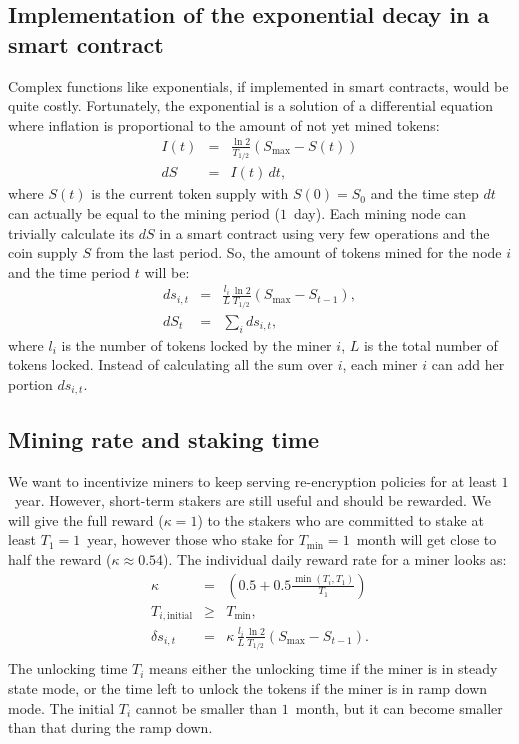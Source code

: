 \documentclass[longbibliography,nofootinbib,twocolumn]{revtex4-1}
\begin{document}
\subsection{Implementation of the exponential decay in a smart contract}

Complex functions like exponentials, if implemented in smart contracts, would be quite costly.
Fortunately, the exponential is a solution of a differential equation where inflation is proportional to the amount of not yet mined tokens:
\begin{eqnarray}
    I(t) &=& \frac{\ln{2}}{T_{1/2}} \left( S_{\max} - S(t) \right)\\
    dS &=& I(t)\, dt,
\end{eqnarray}
where $S(t)$ is the current token supply with $S(0)=S_0$ and the time step $dt$ can actually be equal to the mining period ($1$~day).
Each mining node can trivially calculate its $dS$ in a smart contract using very few operations and the coin supply $S$ from the last period.
So, the amount of tokens mined for the node $i$ and the time period $t$ will be:
\begin{eqnarray}
    \label{eq:rate-max}
    ds_{i,t} &=& \frac{l_i}{L} \frac{\ln{2}}{T_{1/2}} \left( S_{\max} - S_{t-1} \right),\\
    dS_t &=& \sum_i ds_{i,t},
\end{eqnarray}
where $l_i$ is the number of tokens locked by the miner $i$, $L$ is the total number of tokens locked.
Instead of calculating all the sum over $i$, each miner $i$ can add her portion $ds_{i,t}$.

\subsection{Mining rate and staking time}

We want to incentivize miners to keep serving re-encryption policies for at least $1$~year.
However, short-term stakers are still useful and should be rewarded.
We will give the full reward ($\kappa=1$) to the stakers who are committed to stake at least $T_1=1$~year,
however those who stake for $T_{\min}=1$~month will get close to half the reward ($\kappa\approx0.54$).
The individual daily reward rate for a miner looks as:
\begin{eqnarray}
    \kappa &=& \left(0.5 + 0.5\frac{\min(T_i, T_1)}{T_1}\right)\\
    T_{i,\text{initial}} &\ge& T_{\min},\\
    \delta s_{i,t} &=&  \kappa\, \frac{l_i}{L} \frac{\ln{2}}{T_{1/2}} \left( S_{\max} - S_{t-1}\right).\\
\end{eqnarray}
The unlocking time $T_i$ means either the unlocking time if the miner is in steady state mode,
or the time left to unlock the tokens if the miner is in ramp down mode.
The initial $T_i$ cannot be smaller than $1$~month,
but it can become smaller than that during the ramp down.
\end{document}
